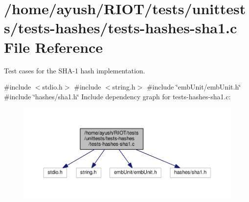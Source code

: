 \hypertarget{tests-hashes-sha1_8c}{}\section{/home/ayush/\+R\+I\+O\+T/tests/unittests/tests-\/hashes/tests-\/hashes-\/sha1.c File Reference}
\label{tests-hashes-sha1_8c}


Test cases for the S\+H\+A-\/1 hash implementation.  


{\ttfamily \#include $<$stdio.\+h$>$}\newline
{\ttfamily \#include $<$string.\+h$>$}\newline
{\ttfamily \#include \char`\"{}emb\+Unit/emb\+Unit.\+h\char`\"{}}\newline
{\ttfamily \#include \char`\"{}hashes/sha1.\+h\char`\"{}}\newline
Include dependency graph for tests-\/hashes-\/sha1.c\+:
\nopagebreak
\begin{figure}[H]
\begin{center}
\leavevmode
\includegraphics[width=350pt]{tests-hashes-sha1_8c__incl}
\end{center}
\end{figure}
